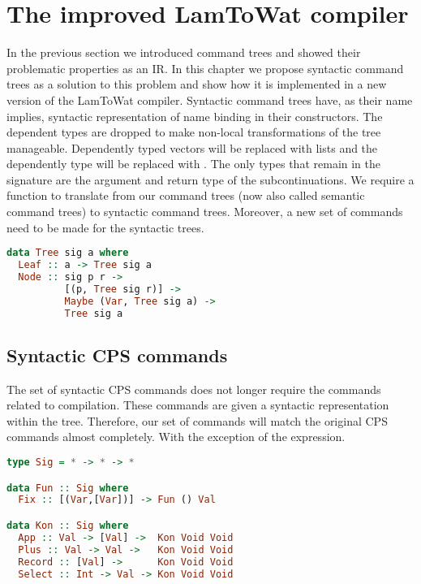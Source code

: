 
\chapter{\label{chap:bettercompiler}The improved LamToWat compiler}
In the previous section we introduced command trees and showed their problematic properties as an \ac{IR}. In this chapter we propose syntactic command trees as a solution to this problem and show how it is implemented in a new version of the LamToWat compiler. Syntactic command trees have, as their name implies, syntactic representation of name binding in their constructors. The dependent types are dropped to make non-local transformations of the tree manageable. Dependently typed vectors will be replaced with lists and the dependently type  will be replaced with . The only types that remain in the signature are the argument  and return type  of the subcontinuations. We require a function to translate from our command trees (now also called semantic command trees) to syntactic command trees. Moreover, a new set of commands need to be made for the syntactic trees.

\begin{lstlisting}[language=Haskell]
data Tree sig a where
  Leaf :: a -> Tree sig a
  Node :: sig p r ->
          [(p, Tree sig r)] ->
          Maybe (Var, Tree sig a) ->
          Tree sig a
\end{lstlisting}

\section{\label{section:syncomtree}Syntactic CPS commands}
The set of syntactic \ac{CPS} commands does not longer require the commands related to compilation. These commands are given a syntactic representation within the tree. Therefore, our set of commands will match the original \ac{CPS} commands almost completely. With the exception of the  expression.

\begin{lstlisting}[language=Haskell]
type Sig = * -> * -> *

data Fun :: Sig where
  Fix :: [(Var,[Var])] -> Fun () Val

data Kon :: Sig where
  App :: Val -> [Val] ->  Kon Void Void
  Plus :: Val -> Val ->   Kon Void Void
  Record :: [Val] ->      Kon Void Void
  Select :: Int -> Val -> Kon Void Void
\end{lstlisting}

